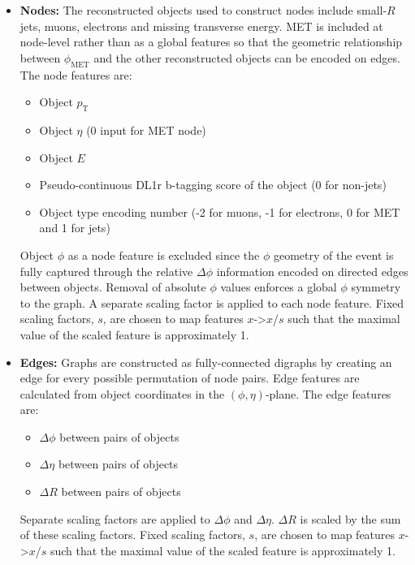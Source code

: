 \begin{itemize}
\item \textbf{Nodes:} The reconstructed objects used to construct nodes include small-$R$ jets, muons, electrons and missing transverse energy. MET is included at node-level rather than as a global features so that the geometric relationship between $\phi_\mathrm{MET}$ and the other reconstructed objects can be encoded on edges. The node features are:
    \begin{itemize}
        \item[--] Object $p_\mathrm{T}$
        \item[--] Object $\eta$ (0 input for MET node)
        \item[--] Object $E$ 
        \item[--] Pseudo-continuous DL1r b-tagging score of the object (0 for non-jets)
        \item[--] Object type encoding number (-2 for muons, -1 for electrons, 0 for MET and 1 for jets)
    \end{itemize}
Object $\phi$ as a node feature is excluded since the $\phi$ geometry of the event is fully captured through the relative $\Delta\phi$ information encoded on directed edges between objects. Removal of absolute $\phi$ values enforces a global $\phi$ symmetry to the graph. A separate scaling factor is applied to each node feature. Fixed scaling factors, $s$, are chosen to map features $x$->$x$/$s$ such that the maximal value of the scaled feature is approximately 1.

\item \textbf{Edges:} Graphs are constructed as fully-connected digraphs by creating an edge for every possible permutation of node pairs. Edge features are calculated from object coordinates in the $(\phi,\eta)$-plane. The edge features are:
    \begin{itemize}
        \item[--] $\Delta \phi$ between pairs of objects
        \item[--] $\Delta \eta$ between pairs of objects
        \item[--] $\Delta R$ between pairs of objects
    \end{itemize}
Separate scaling factors are applied to $\Delta\phi$ and $\Delta\eta$. $\Delta R$ is scaled by the sum of these scaling factors. Fixed scaling factors, $s$, are chosen to map features $x$->$x$/$s$ such that the maximal value of the scaled feature is approximately 1.



\end{itemize}
